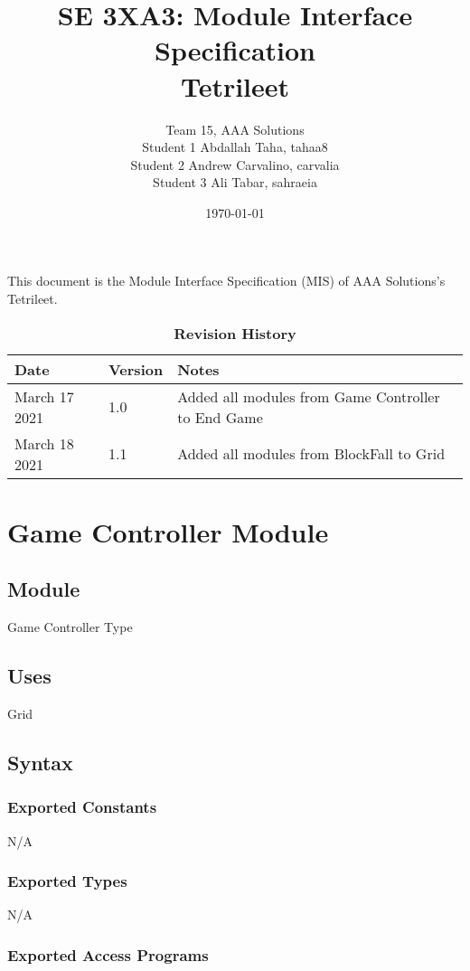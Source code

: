 \documentclass[12pt]{article}
\title{SE 3XA3: Module Interface Specification\\Tetrileet}
\author{Team 15, AAA Solutions
		\\ Student 1 Abdallah Taha, tahaa8
		\\ Student 2 Andrew Carvalino, carvalia
		\\ Student 3 Ali Tabar, sahraeia
}
\date{\today}
\begin{document}
\maketitle

This document is the Module Interface Specification (MIS) of AAA Solutions's Tetrileet.

\begin{table}[bp]
\caption{\bf Revision History}
\begin{tabularx}{\textwidth}{p{3cm}p{2cm}X}
\toprule {\bf Date} & {\bf Version} & {\bf Notes}\\
\midrule
March 17 2021 & 1.0 & Added all modules from Game Controller to End Game \\
March 18 2021 & 1.1 & Added all modules from BlockFall to Grid\\
\bottomrule
\end{tabularx}
\end{table}

\newpage

\section* {Game Controller Module}

\subsection*{Module}

Game Controller Type

\subsection* {Uses}
Grid

\subsection* {Syntax}

\subsubsection* {Exported Constants}
N/A
\subsubsection* {Exported Types}
N/A

\subsubsection* {Exported Access Programs}
\end{document}
